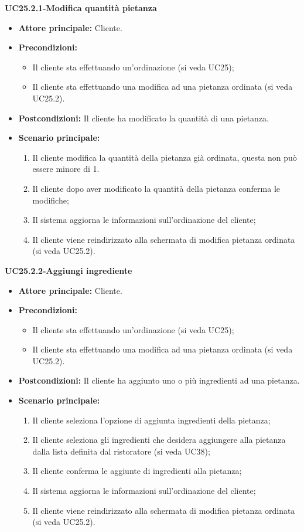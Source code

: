 \textbf{UC25.2.1-Modifica quantità pietanza}
\begin{itemize}
\item \textbf{Attore principale:} Cliente.
\item \textbf{Precondizioni:}
\begin{itemize}
    \item Il cliente sta effettuando un'ordinazione (si veda UC25);
    \item Il cliente sta effettuando una modifica ad una pietanza ordinata (si veda UC25.2).
\end{itemize}
\item \textbf{Postcondizioni:} Il cliente ha modificato la quantità di una pietanza.
\item \textbf{Scenario principale:}
\begin{enumerate}
    \item Il cliente modifica la quantità della pietanza già ordinata, questa non può essere minore di 1.
    \item Il cliente dopo aver modificato la quantità della pietanza conferma le modifiche;
    \item Il sistema aggiorna le informazioni sull'ordinazione del cliente;
    \item Il cliente viene reindirizzato alla schermata di modifica pietanza ordinata (si veda UC25.2).
\end{enumerate}
\end{itemize}

\textbf{UC25.2.2-Aggiungi ingrediente}
\begin{itemize}
\item \textbf{Attore principale:} Cliente.
\item \textbf{Precondizioni:}
\begin{itemize}
    \item Il cliente sta effettuando un'ordinazione (si veda UC25);
    \item Il cliente sta effettuando una modifica ad una pietanza ordinata (si veda UC25.2).
\end{itemize}
\item \textbf{Postcondizioni:} Il cliente ha aggiunto uno o più ingredienti ad una pietanza.
\item \textbf{Scenario principale:}
\begin{enumerate}
    \item Il cliente seleziona l'opzione di aggiunta ingredienti della pietanza;
    \item Il cliente seleziona gli ingredienti che desidera aggiungere alla pietanza dalla lista definita dal ristoratore (si veda UC38);
    \item Il cliente conferma le aggiunte di ingredienti alla pietanza;
    \item Il sistema aggiorna le informazioni sull'ordinazione del cliente;
    \item Il cliente viene reindirizzato alla schermata di modifica pietanza ordinata (si veda UC25.2).
\end{enumerate}
\end{itemize}

